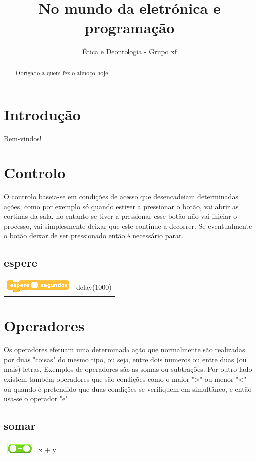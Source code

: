 \documentclass{article}
\begin{document}
\title{No mundo da eletrónica e programação}
\author{Ética e Deontologia - Grupo xf}

\maketitle

\begin{abstract}
Obrigado a quem fez o almoço hoje.
\end{abstract}

\section{Introdução}
Bem-vindos!

\section{Controlo}
O controlo baseia-se em condições de acesso que desencadeiam determinadas ações, como por exemplo só quando estiver a pressionar o botão, vai abrir as cortinas da sala, no entanto se tiver a pressionar esse botão não vai iniciar o processo, vai simplesmente deixar que este continue a decorrer. Se eventualmente o botão deixar de ser pressionado então é necessário parar.

\subsection{espere}
\begin{tabular}{ c c }
    \includegraphics{imgs/controlers/espere} & delay(1000) \\
\end{tabular}

\section{Operadores}
Os operadores efetuam uma determinada ação que normalmente são realizadas por duas "coisas" do mesmo tipo, ou seja, entre dois numeros ou entre duas (ou mais) letras. Exemplos de operadores são as somas ou subtrações. Por outro lado existem também operadores que são condições como o maior ">" ou menor "<" ou quando é pretendido que duas condições se verifiquem em simultâneo, e então usa-se o operador "e".

\subsection{somar}
\begin{tabular}{ c c }
    \includegraphics{imgs/operators/plus} & x + y \\
\end{tabular}
\end{document}
